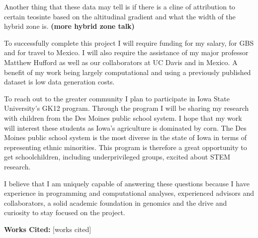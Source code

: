 \documentclass[12pt]{amsart}
\begin{document}
Another thing that these data may tell is if there is a cline of attribution to certain teosinte based on the altitudinal gradient and what the width of the hybrid zone is. \textbf{(more hybrid zone talk)}

To successfully complete this project I will require funding for my salary, for GBS and for travel to Mexico.  I will also require the assistance of my major professor Matthew Hufford as well as our collaborators at UC Davis and in Mexico.
A benefit of my work being largely computational and using a previously published dataset is low data generation costs.

To reach out to the greater community I plan to participate in Iowa State University's GK12 program.  Through the program I will be sharing my research with children from the Des Moines public school system.  
I hope that my work will interest these students as Iowa's agriculture is dominated by corn.
The Des Moines public school system is the most diverse in the state of Iowa in terms of representing ethnic minorities.  This program is therefore a great opportunity to get schoolchildren, including underprivileged groups, excited about STEM research.  

I believe that I am uniquely capable of answering these questions because I have experience in programming and computational analyses, experienced advisors and collaborators, a solid academic foundation in genomics and the drive and curiosity to stay focused on the project.

\textbf{Works Cited:}
\small
[works cited]
\end{document}
